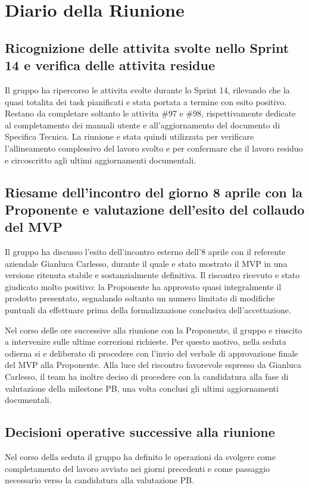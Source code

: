 \documentclass[a4paper, 11pt, oneside]{scrartcl}
\begin{document}
\newpage
\section{Diario della Riunione}

\subsection{Ricognizione delle attivita svolte nello Sprint 14 e verifica delle attivita residue}
Il gruppo ha ripercorso le attivita svolte durante lo Sprint 14, rilevando che la quasi totalita dei task pianificati e stata portata a termine con esito positivo. Restano da completare soltanto le attivita \#97 e \#98, rispettivamente dedicate al completamento dei manuali utente e all'aggiornamento del documento di Specifica Tecnica. La riunione e stata quindi utilizzata per verificare l'allineamento complessivo del lavoro svolto e per confermare che il lavoro residuo e circoscritto agli ultimi aggiornamenti documentali.

\subsection{Riesame dell'incontro del giorno 8 aprile con la Proponente e valutazione dell'esito del collaudo del MVP}
Il gruppo ha discusso l'esito dell'incontro esterno dell'8 aprile con il referente aziendale Gianluca Carlesso, durante il quale e stato mostrato il MVP in una versione ritenuta stabile e sostanzialmente definitiva. Il riscontro ricevuto e stato giudicato molto positivo: la Proponente ha approvato quasi integralmente il prodotto presentato, segnalando soltanto un numero limitato di modifiche puntuali da effettuare prima della formalizzazione conclusiva dell'accettazione.

Nel corso delle ore successive alla riunione con la Proponente, il gruppo e riuscito a intervenire sulle ultime correzioni richieste. Per questo motivo, nella seduta odierna si e deliberato di procedere con l'invio del verbale di approvazione finale del MVP alla Proponente. Alla luce del riscontro favorevole espresso da Gianluca Carlesso, il team ha inoltre deciso di procedere con la candidatura alla fase di valutazione della milestone PB, una volta conclusi gli ultimi aggiornamenti documentali.

\subsection{Decisioni operative successive alla riunione}
Nel corso della seduta il gruppo ha definito le operazioni da svolgere come completamento del lavoro avviato nei giorni precedenti e come passaggio necessario verso la candidatura alla valutazione PB.
\end{document}

